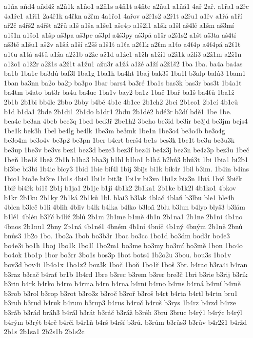 a1ňa
aňd4
aňd4ž
a2ň1k
a1ňo1
a2ň1s
a4ň1t
a4ňte
a2ňu1
a1ňá1
4ař
2ař.
a1řa1
a2řc
4a1ře1
a1ři1
2a4ř1k
a4řkn
a2řm
4a1řo1
4ařov
a2ř1s2
a2ř1t
a2řu1
a1řv
a1řá
a1ří
ař2č
a4řš2
a4řšt
a2řů
a1š
a1ša
a1še1
aše4p
a1š2i1
a1šk
a1šl
aš4lé
a1šm
aš3mí
a1š1n
a1šo1
a1šp
aš3pa
aš3pe
aš3pl
a4š3py
aš3pá
a1šr
a2š1s2
a1št
aš3ta
aš4tí
aš3tě
a1šu1
aš2v
a1šá
a1ší
a2šš
a1š1ť
a1ťa
a2ť1k
a2ťm
a1ťo
a4ť4p
a4ť4pá
a2ť1t
a1ťu
a1ťá
a4ťů
a1ža
a2ž1b
a2žc
až1d
a1že1
a1žh
a1ži1
a2ž1k
ažli3
a2ž1m
a2ž1n
a1žo1
a1ž2r
a2ž1s
a2ž1t
a1žu1
ažu3r
a1žá
a1žé
a1ží
a2ž1š2
1ba
1ba.
ba4a
ba4as
ba1b
1ba1c
ba3dú
baf3l
1ba1g
1ba1h
ba4ht
1baj
bak3š
1ba1l
b3alp
balú3
1bam1
1ban
ba3nn
ba2o
ba2p
ba3po
1bar
bars4
ba3ré
1ba1s
bas3k
bas3r
bas3t
1b4a1t
ba4tm
b4ato
bat3r
ba4u
ba4ue
1ba1v
bay2
ba1z
1bač
1bař
ba1š
ba4ťů
1ba1ž
2b1b
2b1bi
bb4le
2bbo
2bby
b4bé
4b1c
4b1ce
2b1ch2
2bci
2b1co1
2b1cí
4b1ců
b1d
b1da1
2bde
2b1di1
2b1do
b1dr1
2bdu
2b1dé2
bdé3r
b2dí
bdě1
1be
1be.
bea4c
be3an
4beb
bec3q
1bed
bed3ř
2be1h2
3beho
be3id
be3ir
be3jd
be3jm
bejs4
1be1k
bek3h
1bel
be4lg
be4lk
1be3m
be3mk
1be1n
1be3o4
be3o4b
be3o4g
be3o4m
be3o4v
be3p2
be3pn
1ber
b4ert
berš4
be1s
bes3k
1be1t
be3u
be3u3k
be3up
1be3v
be3vs
bez1
bez3d
beze3
bez3f
bez4i
be4z3j
bez3n
be4z3p
bez3u
1beč
1beň
1be1š
1bež
2b1h
b1ha3
bha3j
b1hl
b1ho1
b1há
b2hú3
bhú3t
1bi
1bia1
bi2b1
bi3be
bi3bi
1b4ic
bicy3
1bid
1bie
bif4l
1bij
3bijs
bi1k
bik4r
1bil
b3im.
1b4in
b4ins
1bio1
bio3e
bi3re
1bi1s
4bisl
1bi1t
bit3t
1bi1v
bi3vo
1bi1z
biz3n
1biá
1bič
3bičk
1biř
bi4řk
bi1š
2b1j
b1ja1
2b1je
b1jí
4b1k2
2b1ka1
2b1ke
b1k2l
4b1ko1
4bkov
b1kr
2b1ku
2b1ky
2b1ká
2b1ků
1bl.
blai3
b3lak
4blač
4blaň
b3lbu
ble1
ble4h
4blen
b3leč
b1li
4blih
4bliv
b4lk
b4lka
b4lko
b3loň
2blu
b3lun
b4lyo
blyš3
b3lám
b1lé1
4blén
b3líč
b4líž
2blů
2b1m
2b1me
b1mě
4b1n
2b1na1
2b1ne
2b1ni
4b1no
4bnos
2b1nu1
2bny
2b1ná
4b1né1
4bném
4b1ní
4bníč
4b1ný
4bným
2b1ně
2bnů
bnůs3
1b2o
1bo.
1bo2a
1bob
bo3b3r
1boc
bo3cc
1bo1d
bo3dm
bod3r
bo4e3
bo4e3i
bo1h
1boj
1bo1k
1bo1l
1bo2m1
bo3me
bo3my
bo3mí
bo3mě
1bon
1bo4o
bo4ok
1bo1p
1bor
bo3rr
3bo1s
bos3p
1bot
bots4
1b2o2u
3bou.
bou3s
1bo1v
bov3d
bov4i
1b4o1x
1bo1z2
boz3k
1boč
1boň
1bo1ř
1boš
3br.
b4rac
b3ra4i
b4ran
b3raz
b3rač
b4rať
br1b
1b4rd
1bre
b3rec
b3rem
b3rer
bre3č
1bri
b3rie
b3rij
b3rik
b3rin
b4rk
b4rko
b4rm
b4rma
b4rn
b4rna
b4rni
b4rno
b4rns
b4rná
b4rní
b4rně
b3rob
b3rol
b3rop
b3rot
b3ro3z
b3roč
b3roř
b3roš
b4rt
b4rta
b4rtl
b4rtn
bru1
b3rub
b3rud
b4ruk
b4rum
b3rup3
b4rus
b4ruč
b4ruš
b3rys
1b4rz
b4rzd
b4rze
b3ráb
b3rád
bráh3
b4rál
b3rát
b3ráč
b3ráž
b3réh
3brü
3brüc
b4rý1
b4rýc
b4rýl
b4rým
b3rýt
b4rč
b4rči
b4r1ň
b4rš
b4rší
b3rů.
b3rům
b3růs3
b3rův
b4r2ž1
b4ržd
2b1s
2b1sa1
2b2s1b
2b1s2c
